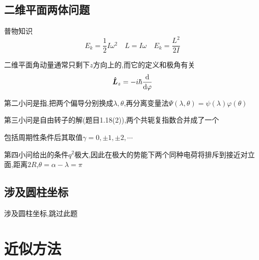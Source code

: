 \documentclass{article}
\begin{document}
        \subsection{二维平面两体问题}
            \begin{formal}
                普物知识
                $$ E_{k} = \frac{1}{2} I \omega^{2} \quad L = I \omega \quad E_{k} = \frac{L^{2}}{2I} $$

                二维平面角动量通常只剩下$z$方向上的,而它的定义和极角有关
                $$ \vu*{L}_{z} = -i \hbar \dv{\varphi}   $$ 
            \end{formal}

            第二小问是指,把两个偏导分别换成$\lambda,\theta$,再分离变量法$ \Psi(\lambda,\theta) = \psi(\lambda)\varphi(\theta)  $

            第三小问是自由转子的解(题目1.18(2)),两个共轭复指数合并成了一个
            
            包括周期性条件后其取值$\gamma = 0,\pm1,\pm2,\cdots$

            第四小问给出的条件$q^{2}$极大,因此在极大的势能下两个同种电荷将排斥到接近对立面,距离$2R$,$\theta = \alpha - \lambda = \pi$

        \subsection{涉及圆柱坐标}
            涉及圆柱坐标,跳过此题









    \section{近似方法}
\end{document}
